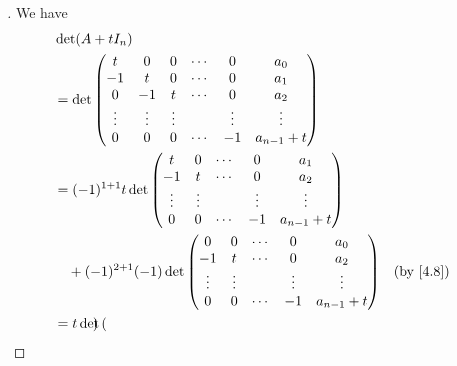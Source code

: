 \begin{proof}[]
	We have
	\begin{align*}
		 & \det(A + t I_n)                                                                                                                \\
		 & = \det\begin{pmatrix}
			         t      & 0      & 0      & \cdots & 0      & a_0           \\
			         -1     & t      & 0      & \cdots & 0      & a_1           \\
			         0      & -1     & t      & \cdots & 0      & a_2           \\
			         \vdots & \vdots & \vdots &        & \vdots & \vdots        \\
			         0      & 0      & 0      & \cdots & -1     & a_{n - 1} + t
		         \end{pmatrix}                                                               \\
		 & = (-1)^{1 + 1} t \det\begin{pmatrix}
			                        t      & 0      & \cdots & 0      & a_1           \\
			                        -1     & t      & \cdots & 0      & a_2           \\
			                        \vdots & \vdots &        & \vdots & \vdots        \\
			                        0      & 0      & \cdots & -1     & a_{n - 1} + t
		                        \end{pmatrix}                                                         \\
		 & \quad + (-1)^{2 + 1} (-1) \det\begin{pmatrix}
			                                 0      & 0      & \cdots & 0      & a_0           \\
			                                 -1     & t      & \cdots & 0      & a_2           \\
			                                 \vdots & \vdots &        & \vdots & \vdots        \\
			                                 0      & 0      & \cdots & -1     & a_{n - 1} + t
		                                 \end{pmatrix}                                            &  & \by{4.8}                           \\
		 & = t \det\begin{pmatrix}

\end{pmatrix}
\end{align*}
\end{proof}
